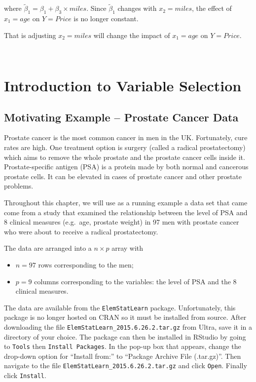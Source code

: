 \documentclass[
]{article}
\providecommand{\tightlist}{%
  \setlength{\itemsep}{0pt}\setlength{\parskip}{0pt}}
\begin{document}
where \(\tilde{\beta}_1 = \beta_1+\beta_3\times miles\). Since
\(\tilde{\beta}_1\) changes with \(x_2=miles\), the effect of
\(x_1=age\) on \(Y=Price\) is no longer constant.

That is adjusting \(x_2=miles\) will change the impact of \(x_1=age\) on
\(Y=Price\).

\(~\)

\hypertarget{sec:varselection}{%
\section{Introduction to Variable Selection}\label{sec:varselection}}

\hypertarget{subsec:prostatecancerdata}{%
\subsection{Motivating Example -- Prostate Cancer
Data}\label{subsec:prostatecancerdata}}

Prostate cancer is the most common cancer in men in the UK. Fortunately,
cure rates are high. One treatment option is surgery (called a radical
prostatectomy) which aims to remove the whole prostate and the prostate
cancer cells inside it. Prostate-specific antigen (PSA) is a protein
made by both normal and cancerous prostate cells. It can be elevated in
cases of prostate cancer and other prostate problems.

Throughout this chapter, we will use as a running example a data set
that came come from a study that examined the relationship between the
level of PSA and 8 clinical measures (e.g.~age, prostate weight) in 97
men with prostate cancer who were about to receive a radical
prostatectomy.

The data are arranged into a \(n \times p\) array with

\begin{itemize}
\tightlist
\item
  \(n=97\) rows corresponding to the men;
\item
  \(p=9\) columns corresponding to the variables: the level of PSA and
  the 8 clinical measures.
\end{itemize}

The data are available from the \texttt{ElemStatLearn} package.
Unfortunately, this package is no longer hosted on CRAN so it must be
installed from source. After downloading the file
\texttt{ElemStatLearn\_2015.6.26.2.tar.gz} from Ultra, save it in a
directory of your choice. The package can then be installed in RStudio
by going to \texttt{Tools} then \texttt{Install\ Packages}. In the
pop-up box that appears, change the drop-down option for ``Install
from:'' to ``Package Archive File (.tar.gz)''. Then navigate to the file
\texttt{ElemStatLearn\_2015.6.26.2.tar.gz} and click \texttt{Open}.
Finally click \texttt{Install}.
\end{document}
